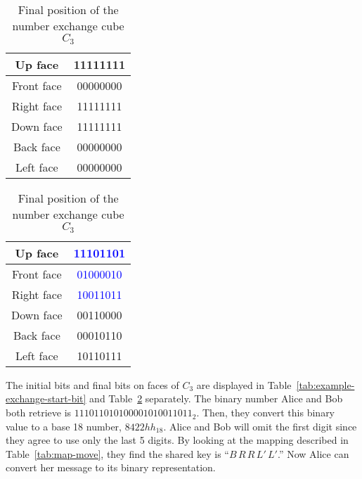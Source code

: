 \begin{table}[ht]
    \centering
    \begin{minipage}{0.45\textwidth}
        \centering
        \begin{tabular}{|c|c|}
            \hline Up face & 11111111  \\
            \hline Front face & 00000000  \\
            \hline Right face & 11111111  \\
            \hline Down face & 11111111  \\
            \hline Back face & 00000000  \\
            \hline Left face & 00000000  \\ \hline
        \end{tabular}
        \caption{Starting position of the \\\hspace{\textwidth} number exchange cube $C_3$}
        \label{tab:example-exchange-start-bit}
    \end{minipage}
    \begin{minipage}{0.45\textwidth}
        \centering
        \begin{tabular}{|c|c|}
            \hline Up face & \textcolor{blue}{11101101}  \\
            \hline Front face & \textcolor{blue}{01000010}  \\
            \hline Right face & \textcolor{blue}{10011011}  \\
            \hline Down face & 00110000  \\
            \hline Back face & 00010110  \\
            \hline Left face & 10110111  \\ \hline
        \end{tabular}
        \caption{Final position of the \\\hspace{\textwidth} number exchange cube $C_3$}
        \label{tab:example-exchange-final-bit}
    \end{minipage}
\end{table}
The initial bits and final bits on faces of $C_3$ are displayed in Table~\ref{tab:example-exchange-start-bit} and Table~\ref{tab:example-exchange-final-bit} separately. The binary number Alice and Bob both retrieve is $111011010100001010011011_2$. Then, they convert this binary value to a base 18 number, $8422hh_{18}$. Alice and Bob will omit the first digit since they agree to use only the last 5 digits. By looking at the mapping described in Table~\ref{tab:map-move}, they find the shared key is ``$B\,R\,R\,L'\,L'$.'' Now Alice can convert her message to its binary representation.

